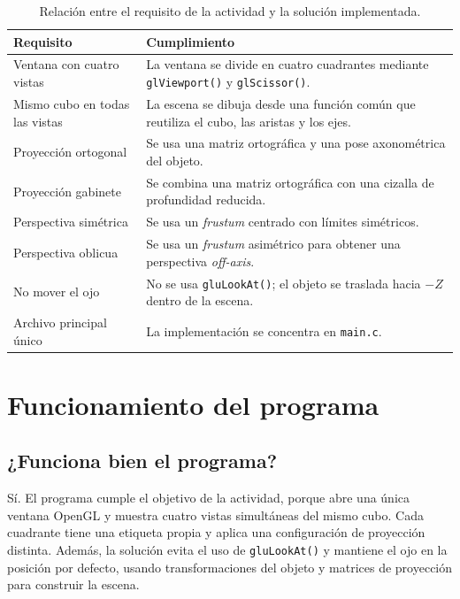 \documentclass[12pt,a4paper]{article}
\begin{document}
\begin{table}[H]
\centering
\caption{Relación entre el requisito de la actividad y la solución implementada.}
\label{tab:requisitos}
\begin{tabular}{p{}p{}}
\toprule
\textbf{Requisito} & \textbf{Cumplimiento} \\
\midrule
Ventana con cuatro vistas & La ventana se divide en cuatro cuadrantes mediante \texttt{glViewport()} y \texttt{glScissor()}. \\
Mismo cubo en todas las vistas & La escena se dibuja desde una función común que reutiliza el cubo, las aristas y los ejes. \\
Proyección ortogonal & Se usa una matriz ortográfica y una pose axonométrica del objeto. \\
Proyección gabinete & Se combina una matriz ortográfica con una cizalla de profundidad reducida. \\
Perspectiva simétrica & Se usa un \emph{frustum} centrado con límites simétricos. \\
Perspectiva oblicua & Se usa un \emph{frustum} asimétrico para obtener una perspectiva \emph{off-axis}. \\
No mover el ojo & No se usa \texttt{gluLookAt()}; el objeto se traslada hacia $-Z$ dentro de la escena. \\
Archivo principal único & La implementación se concentra en \texttt{main.c}. \\
\bottomrule
\end{tabular}
\end{table}

\section{Funcionamiento del programa}

\subsection{¿Funciona bien el programa?}

Sí. El programa cumple el objetivo de la actividad, porque abre una única ventana OpenGL y muestra cuatro vistas simultáneas del mismo cubo. Cada cuadrante tiene una etiqueta propia y aplica una configuración de proyección distinta. Además, la solución evita el uso de \texttt{gluLookAt()} y mantiene el ojo en la posición por defecto, usando transformaciones del objeto y matrices de proyección para construir la escena.
\end{document}
